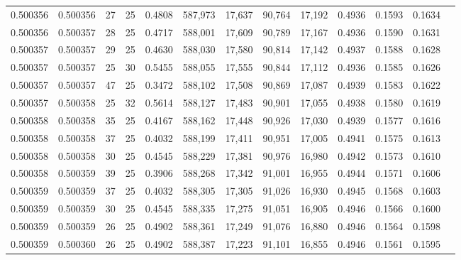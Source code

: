 \begin{tabular}{rrrrrrrrrrrrr}
0.500356 & 0.500356 &    27 &  25 &                                     0.4808 & 587,973 &  17,637 &  90,764 &  17,192 & 0.4936 & 0.1593 & 0.1634 \\
0.500356 & 0.500357 &    28 &  25 &                                     0.4717 & 588,001 &  17,609 &  90,789 &  17,167 & 0.4936 & 0.1590 & 0.1631 \\
0.500357 & 0.500357 &    29 &  25 &                                     0.4630 & 588,030 &  17,580 &  90,814 &  17,142 & 0.4937 & 0.1588 & 0.1628 \\
0.500357 & 0.500357 &    25 &  30 &                                     0.5455 & 588,055 &  17,555 &  90,844 &  17,112 & 0.4936 & 0.1585 & 0.1626 \\
0.500357 & 0.500357 &    47 &  25 &                                     0.3472 & 588,102 &  17,508 &  90,869 &  17,087 & 0.4939 & 0.1583 & 0.1622 \\
0.500357 & 0.500358 &    25 &  32 &                                     0.5614 & 588,127 &  17,483 &  90,901 &  17,055 & 0.4938 & 0.1580 & 0.1619 \\
0.500358 & 0.500358 &    35 &  25 &                                     0.4167 & 588,162 &  17,448 &  90,926 &  17,030 & 0.4939 & 0.1577 & 0.1616 \\
0.500358 & 0.500358 &    37 &  25 &                                     0.4032 & 588,199 &  17,411 &  90,951 &  17,005 & 0.4941 & 0.1575 & 0.1613 \\
0.500358 & 0.500358 &    30 &  25 &                                     0.4545 & 588,229 &  17,381 &  90,976 &  16,980 & 0.4942 & 0.1573 & 0.1610 \\
0.500358 & 0.500359 &    39 &  25 &                                     0.3906 & 588,268 &  17,342 &  91,001 &  16,955 & 0.4944 & 0.1571 & 0.1606 \\
0.500359 & 0.500359 &    37 &  25 &                                     0.4032 & 588,305 &  17,305 &  91,026 &  16,930 & 0.4945 & 0.1568 & 0.1603 \\
0.500359 & 0.500359 &    30 &  25 &                                     0.4545 & 588,335 &  17,275 &  91,051 &  16,905 & 0.4946 & 0.1566 & 0.1600 \\
0.500359 & 0.500359 &    26 &  25 &                                     0.4902 & 588,361 &  17,249 &  91,076 &  16,880 & 0.4946 & 0.1564 & 0.1598 \\
0.500359 & 0.500360 &    26 &  25 &                                     0.4902 & 588,387 &  17,223 &  91,101 &  16,855 & 0.4946 & 0.1561 & 0.1595 \\

\end{tabular}
